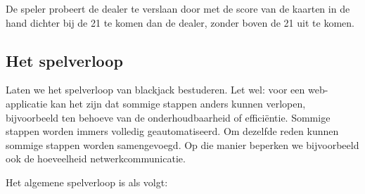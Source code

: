 De speler probeert de dealer te verslaan door met de score van de kaarten 
in de hand dichter bij de 21 te komen dan de dealer, 
zonder boven de 21 uit te komen.

\subsection{Het spelverloop}
Laten we het spelverloop van blackjack bestuderen.
Let wel: voor een web-applicatie kan het zijn dat sommige stappen
anders kunnen verlopen, bijvoorbeeld ten behoeve van de onderhoudbaarheid
of efficiëntie. Sommige stappen worden immers volledig geautomatiseerd. 
Om dezelfde reden kunnen sommige stappen worden samengevoegd. 
Op die manier beperken we bijvoorbeeld ook de hoeveelheid netwerkcommunicatie.

Het algemene spelverloop is als volgt:
